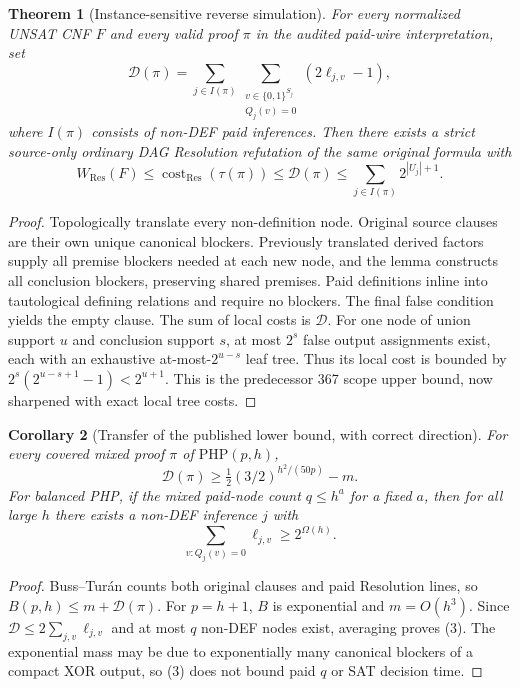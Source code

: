 \documentclass[11pt]{article}
\newtheorem{theorem}{Theorem}
\newtheorem{corollary}[theorem]{Corollary}
\begin{document}
\begin{theorem}[Instance-sensitive reverse simulation]
For every normalized UNSAT CNF $F$ and every valid proof $\pi$ in the audited paid-wire interpretation, set
\[
\mathcal D(\pi)=\sum_{j\in I(\pi)}\sum_{\substack{v\in\{0,1\}^{S_j}\\Q_j(v)=0}}(2\ell_{j,v}-1),
\]
where $I(\pi)$ consists of non-DEF paid inferences. Then there exists a strict source-only ordinary DAG Resolution refutation of the \emph{same} original formula with
\[
\boxed{W_{\mathrm{Res}}(F)\le \operatorname{cost}_{\mathrm{Res}}(\tau(\pi))\le\mathcal D(\pi)\le\sum_{j\in I(\pi)}2^{|U_j|+1}.}
\tag{1}
\]
\end{theorem}
\begin{proof}
Topologically translate every non-definition node. Original source clauses are their own unique canonical blockers. Previously translated derived factors supply all premise blockers needed at each new node, and the lemma constructs all conclusion blockers, preserving shared premises. Paid definitions inline into tautological defining relations and require no blockers. The final false condition yields the empty clause. The sum of local costs is $\mathcal D$. For one node of union support $u$ and conclusion support $s$, at most $2^s$ false output assignments exist, each with an exhaustive at-most-$2^{u-s}$ leaf tree. Thus its local cost is bounded by $2^s(2^{u-s+1}-1)<2^{u+1}$. This is the predecessor 367 scope upper bound, now sharpened with exact local tree costs.
\end{proof}

\begin{corollary}[Transfer of the published lower bound, with correct direction]
For every covered mixed proof $\pi$ of $\mathrm{PHP}(p,h)$,
\[
\boxed{\mathcal D(\pi)\ge \tfrac12(3/2)^{h^2/(50p)}-m.}\tag{2}
\]
For balanced PHP, if the mixed paid-node count $q\le h^a$ for a fixed $a$, then for all large $h$ there exists a non-DEF inference $j$ with
\[
\sum_{v:Q_j(v)=0}\ell_{j,v}\ge 2^{\Omega(h)}.
\tag{3}
\]
\end{corollary}
\begin{proof}
Buss--Tur\'an counts both original clauses and paid Resolution lines, so $B(p,h)\le m+\mathcal D(\pi)$. For $p=h+1$, $B$ is exponential and $m=O(h^3)$. Since $\mathcal D\le2\sum_{j,v}\ell_{j,v}$ and at most $q$ non-DEF nodes exist, averaging proves (3). The exponential mass may be due to exponentially many canonical blockers of a compact XOR output, so (3) does not bound paid $q$ or SAT decision time.
\end{proof}
\end{document}

